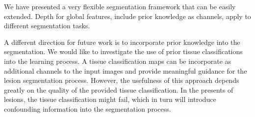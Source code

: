 
We have presented a very flexible segmentation framework that can be easily
extended. Depth for global features, include
prior knowledge as channels, apply to different segmentation tasks.

A different direction for future work is to incorporate prior knowledge into the
segmentation. We would like to investigate the use of prior tissue
classifications into the learning process. A tissue classification maps can be
incorporate as additional channels to the input images and provide meaningful
guidance for the lesion segmentation process. However, the usefulness of this
approach depends greatly on the quality of the provided tissue classification.
In the presents of lesions, the tissue classification might fail, which in turn
will introduce confounding information into the segmentation process.
